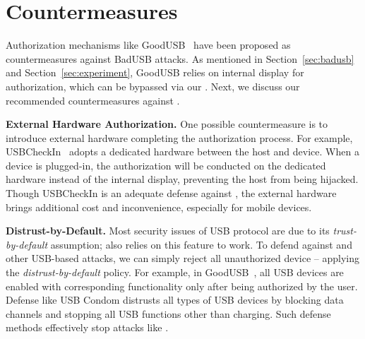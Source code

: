 \section{Countermeasures}
\label{sec:countermeasures}

Authorization mechanisms like GoodUSB~\cite{tian2015defending} have been
proposed as countermeasures against BadUSB attacks. As mentioned in
Section~\ref{sec:badusb} and Section~\ref{sec:experiment}, GoodUSB relies on
internal display for authorization, which can be bypassed via our \tool. 
Next, we discuss our recommended countermeasures against \tool.

\textbf{External Hardware Authorization.} One possible countermeasure is to
introduce external hardware completing the authorization process. For example,
 USBCheckIn~\cite{usbcheckin} adopts a dedicated hardware between
the host and device. When a device is plugged-in, the authorization will be
conducted on the dedicated hardware instead of the internal display, preventing
the host from being hijacked. Though USBCheckIn is an adequate defense against
\tool, the external hardware brings additional cost and inconvenience,
especially for mobile devices.

\textbf{Distrust-by-Default.} Most security issues of \ac{USB} protocol are due to
its \textit{trust-by-default} assumption; \tool also relies on this feature to work.
To defend against \tool and other USB-based attacks, we can simply reject all
{unauthorized} device -- applying the \textit{distrust-by-default} policy. For example, 
in GoodUSB~\cite{tian2015defending}, all \ac{USB} devices are enabled with corresponding 
functionality only after being authorized by the user. 
Defense like USB Condom distrusts all types of \ac{USB} devices by blocking data channels and stopping all \ac{USB} functions other than charging.
Such defense methods effectively stop attacks 
like \tool.

